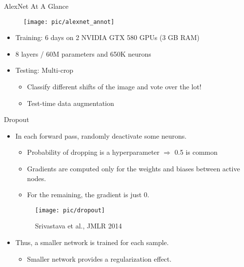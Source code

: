 \documentclass[serif, aspectratio=169]{beamer}
\begin{document}
\begin{frame}{AlexNet At A Glance}
	\begin{figure}[htpb]
		\begin{center}
			\texttt{[image: pic/alexnet\_annot]}
		\end{center}
	\end{figure}
	\vspace{-0.2cm}
	\begin{itemize}
		\setlength{\itemsep}{-1.6pt}
		\item Training: 6 days on 2 NVIDIA GTX 580 GPUs (3 GB RAM)
		\item 8 layers / 60M parameters and 650K neurons
		\item Testing: Multi-crop
		\begin{itemize}
			\setlength{\itemsep}{-1.6pt}
			\item Classify different shifts of the image and vote over the lot!
			\item Test-time data augmentation
		\end{itemize}
	\end{itemize}
\end{frame}

\begin{frame}{Dropout}
	\begin{itemize}
		\item In each forward pass, randomly deactivate some neurons.
		\begin{itemize}
			\item Probability of dropping is a hyperparameter $\Rightarrow$ 0.5 is common
			\item Gradients are computed only for the weights and biases between active nodes.
			\item For the remaining, the gradient is just 0.
		\end{itemize}
		\begin{figure}[htpb]
			\begin{center}
				\texttt{[image: pic/dropout]}
				\caption*{\scriptsize Srivastava et al., JMLR 2014}
			\end{center}
		\end{figure}
		\vspace{-1em}
		\item Thus, a smaller network is trained for each sample.
		\begin{itemize}
			\item Smaller network provides a regularization effect.
		\end{itemize}
	\end{itemize}
\end{frame}
\end{document}
